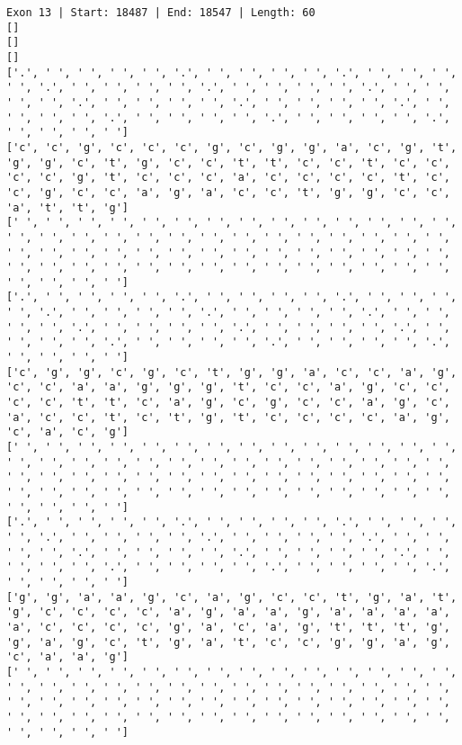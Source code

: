 \documentclass{article}
\begin{document}
\begin{Verbatim}
Exon 13 | Start: 18487 | End: 18547 | Length: 60
[]
[]
[]
['.', ' ', ' ', ' ', ' ', '.', ' ', ' ', ' ', ' ', '.', ' ', ' ', ' ', ' ', '.', ' ', ' ', ' ', ' ', '.', ' ', ' ', ' ', ' ', '.', ' ', ' ', ' ', ' ', '.', ' ', ' ', ' ', ' ', '.', ' ', ' ', ' ', ' ', '.', ' ', ' ', ' ', ' ', '.', ' ', ' ', ' ', ' ', '.', ' ', ' ', ' ', ' ', '.', ' ', ' ', ' ', ' ']
['c', 'c', 'g', 'c', 'c', 'c', 'g', 'c', 'g', 'g', 'a', 'c', 'g', 't', 'g', 'g', 'c', 't', 'g', 'c', 'c', 't', 't', 'c', 'c', 't', 'c', 'c', 'c', 'c', 'g', 't', 'c', 'c', 'c', 'a', 'c', 'c', 'c', 'c', 't', 'c', 'c', 'g', 'c', 'c', 'a', 'g', 'a', 'c', 'c', 't', 'g', 'g', 'c', 'c', 'a', 't', 't', 'g']
[' ', ' ', ' ', ' ', ' ', ' ', ' ', ' ', ' ', ' ', ' ', ' ', ' ', ' ', ' ', ' ', ' ', ' ', ' ', ' ', ' ', ' ', ' ', ' ', ' ', ' ', ' ', ' ', ' ', ' ', ' ', ' ', ' ', ' ', ' ', ' ', ' ', ' ', ' ', ' ', ' ', ' ', ' ', ' ', ' ', ' ', ' ', ' ', ' ', ' ', ' ', ' ', ' ', ' ', ' ', ' ', ' ', ' ', ' ', ' ']
['.', ' ', ' ', ' ', ' ', '.', ' ', ' ', ' ', ' ', '.', ' ', ' ', ' ', ' ', '.', ' ', ' ', ' ', ' ', '.', ' ', ' ', ' ', ' ', '.', ' ', ' ', ' ', ' ', '.', ' ', ' ', ' ', ' ', '.', ' ', ' ', ' ', ' ', '.', ' ', ' ', ' ', ' ', '.', ' ', ' ', ' ', ' ', '.', ' ', ' ', ' ', ' ', '.', ' ', ' ', ' ', ' ']
['c', 'g', 'g', 'c', 'g', 'c', 't', 'g', 'g', 'a', 'c', 'c', 'a', 'g', 'c', 'c', 'a', 'a', 'g', 'g', 'g', 't', 'c', 'c', 'a', 'g', 'c', 'c', 'c', 'c', 't', 't', 'c', 'a', 'g', 'c', 'g', 'c', 'c', 'a', 'g', 'c', 'a', 'c', 'c', 't', 'c', 't', 'g', 't', 'c', 'c', 'c', 'c', 'a', 'g', 'c', 'a', 'c', 'g']
[' ', ' ', ' ', ' ', ' ', ' ', ' ', ' ', ' ', ' ', ' ', ' ', ' ', ' ', ' ', ' ', ' ', ' ', ' ', ' ', ' ', ' ', ' ', ' ', ' ', ' ', ' ', ' ', ' ', ' ', ' ', ' ', ' ', ' ', ' ', ' ', ' ', ' ', ' ', ' ', ' ', ' ', ' ', ' ', ' ', ' ', ' ', ' ', ' ', ' ', ' ', ' ', ' ', ' ', ' ', ' ', ' ', ' ', ' ', ' ']
['.', ' ', ' ', ' ', ' ', '.', ' ', ' ', ' ', ' ', '.', ' ', ' ', ' ', ' ', '.', ' ', ' ', ' ', ' ', '.', ' ', ' ', ' ', ' ', '.', ' ', ' ', ' ', ' ', '.', ' ', ' ', ' ', ' ', '.', ' ', ' ', ' ', ' ', '.', ' ', ' ', ' ', ' ', '.', ' ', ' ', ' ', ' ', '.', ' ', ' ', ' ', ' ', '.', ' ', ' ', ' ', ' ']
['g', 'g', 'a', 'a', 'g', 'c', 'a', 'g', 'c', 'c', 't', 'g', 'a', 't', 'g', 'c', 'c', 'c', 'c', 'a', 'g', 'a', 'a', 'g', 'a', 'a', 'a', 'a', 'a', 'c', 'c', 'c', 'c', 'g', 'a', 'c', 'a', 'g', 't', 't', 't', 'g', 'g', 'a', 'g', 'c', 't', 'g', 'a', 't', 'c', 'c', 'g', 'g', 'a', 'g', 'c', 'a', 'a', 'g']
[' ', ' ', ' ', ' ', ' ', ' ', ' ', ' ', ' ', ' ', ' ', ' ', ' ', ' ', ' ', ' ', ' ', ' ', ' ', ' ', ' ', ' ', ' ', ' ', ' ', ' ', ' ', ' ', ' ', ' ', ' ', ' ', ' ', ' ', ' ', ' ', ' ', ' ', ' ', ' ', ' ', ' ', ' ', ' ', ' ', ' ', ' ', ' ', ' ', ' ', ' ', ' ', ' ', ' ', ' ', ' ', ' ', ' ', ' ', ' ']

\end{Verbatim}
\end{document}
